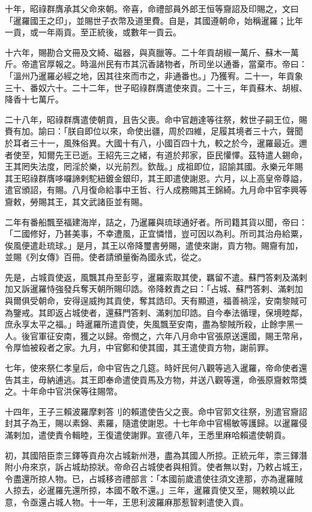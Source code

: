 \begin{pinyinscope}
十年，昭祿群膺承其父命來朝。帝喜，命禮部員外郎王恒等齎詔及印賜之，文曰「暹羅國王之印」，並賜世子衣幣及道里費。自是，其國遵朝命，始稱暹羅；比年一貢，或一年兩貢。至正統後，或數年一貢云。

十六年，賜勘合文冊及文綺、磁器，與真臘等。二十年貢胡椒一萬斤、蘇木一萬斤。帝遣官厚報之。時溫州民有市其沉香諸物者，所司坐以通番，當棄市。帝曰：「溫州乃暹羅必經之地，因其往來而市之，非通番也。」乃獲宥。二十一，年貢象三十、番奴六十。二十二年，世子昭祿群膺遣使來貢。二十三，年貢蘇木、胡椒、降香十七萬斤。

二十八年，昭祿群膺遣使朝貢，且告父喪。命中官趙達等往祭，敕世子嗣王位，賜賚有加。諭曰：「朕自即位以來，命使出疆，周於四維，足履其境者三十六，聲聞於耳者三十一，風殊俗異。大國十有八，小國百四十九，較之於今，暹羅最近。邇者使至，知爾先王已逝。王紹先三之緒，有道於邦家，臣民懽懌。茲特遣人錫命，王其罔失法度，罔淫於樂，以光前烈。欽哉。」成祖即位，詔諭其國。永樂元年賜其王昭祿群膺哆囉諦剌駝紐鍍金銀印，其王即遣使謝恩。六月，以上高皇帝尊謚，遣官頒詔，有賜。八月復命給事中王哲、行人成務賜其王錦綺。九月命中官李興等齎敕，勞賜其王，其文武諸臣並有賜。

二年有番船飄至福建海岸，詰之，乃暹羅與琉球通好者。所司籍其貨以聞，帝曰：「二國修好，乃甚美事，不幸遭風，正宜憐惜，豈可因以為利。所司其治舟給粟，俟風便遣赴琉球。」是月，其王以帝降璽書勞賜，遣使來謝，貢方物。賜齎有加，並賜《列女傳》百冊。使者請頒量衡為國永式，從之。

先是，占城貢使返，風飄其舟至彭亨，暹羅索取其使，羈留不遣。蘇門答剌及滿剌加又訴暹羅恃強發兵奪天朝所賜印誥。帝降敕責之曰：「占城、蘇門答剌、滿剌加與爾俱受朝命，安得逞威拘其貢使，奪其誥印。天有顯道，福善禍淫，安南黎賊可為鑒戒。其即返占城使者，還蘇門答剌、滿剌加印誥。自今奉法循理，保境睦鄰，庶永享太平之福。」時暹羅所遣貢使，失風飄至安南，盡為黎賊所殺，止餘孛黑一人。後官軍征安南，獲之以歸。帝憫之，六年八月命中官張原送還國，賜王幣帛，令厚恤被殺者之家。九月，中官鄭和使其國，其王遣使貢方物，謝前罪。

七年，使來祭仁孝皇后，命中官告之几筵。時奸民何八觀等逃入暹羅，帝命使者還告其主，毋納逋逃。其王即奉命遣使貢馬及方物，并送八觀等還，命張原齎敕幣獎之。十年命中官洪保等往賜幣。

十四年，王子三賴波羅摩剌答刂的賴遣使告父之喪。命中官郭文往祭，別遣官齎詔封其子為王，賜以素錦、素羅，隨遣使謝恩。十七年命中官楊敏等護歸。以暹羅侵滿剌加，遣使責令輯睦，王復遣使謝罪。宣德八年，王悉里麻哈賴遣使朝貢。

初，其國陪臣柰三鐸等貢舟次占城新州港，盡為其國人所掠。正統元年，柰三鐸潛附小舟來京，訴占城劫掠狀。帝命召占城使者與相質。使者無以對，乃敕占城王，令盡還所掠人物。已，占城移咨禮部言：「本國前歲遣使往須文達那，亦為暹羅賊人掠去，必暹羅先還所掠，本國不敢不還。」三年，暹羅貢使又至，賜敕曉以此意，令亟還占城人物。十一年，王思利波羅麻那惹智剌遣使入貢。


\end{pinyinscope}
